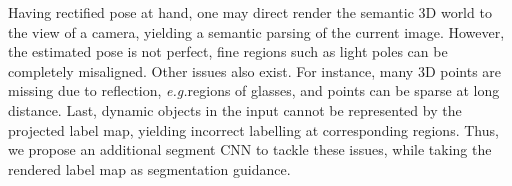 \documentclass[10pt,twocolumn,letterpaper]{article}
\makeatletter
\newcommand{\figref}[1]{Fig\onedot~\ref{#1}}
\newcommand{\secref}[1]{Sec\onedot~\ref{#1}}
\newcommand{\ve}[1]{{\mathbf #1}} %
\newcommand{\hua}[1]{{\mathcal #1}}
\DeclareRobustCommand\onedot{\futurelet\@let@token\@onedot}
\def\onedot{\ifx\@let@token.\else.\null\fi\xspace}
\def\eg{\emph{e.g.}}
\makeatother
\begin{document}
Having rectified pose at hand, one may direct render the semantic 3D world to the view of a camera, yielding a semantic parsing of the current image. However, the estimated pose is not perfect, fine regions such as light poles can be completely misaligned. Other issues also exist. For instance, many 3D points are missing due to reflection, \eg regions of glasses, and points can be sparse at long distance. Last, dynamic objects in the input cannot be represented by the projected label map, yielding incorrect labelling at corresponding regions. Thus, we propose an additional segment CNN to tackle these issues, while taking the rendered label map as segmentation guidance. 
\end{document}
